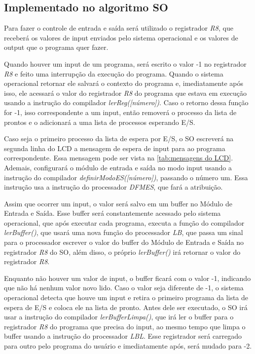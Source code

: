 \documentclass[
	12pt,				%
	oneside,
	a4paper,			%
	english,			%
	french,				%
	spanish,			%
	brazil,				%
	]{abntex2}
\begin{document}
\subsection{Implementado no algoritmo SO}

Para fazer o controle de entrada e saída será utilizado o registrador \textit{R8}, que receberá os valores de input enviados pelo sistema operacional e os valores de output que o programa quer fazer. 

Quando houver um input de um programa, será escrito o valor -1 no registrador \textit{R8} e feito uma interrupção da execução do programa. Quando o sistema operacional retornar ele salvará o contexto do programa e, imediatamente após isso, ele acessará o valor do registrador \textit{R8} do programa que estava em execução usando a instrução do compilador \textit{lerReg([número])}. Caso o retorno dessa função for -1, isso correspondente a um input, então removerá o processo da lista de prontos e o adicionará a uma lista de processos esperando E/S. 

Caso seja o primeiro processo da lista de espera por E/S, o SO escreverá na segunda linha do LCD a mensagem de espera de input para ao programa correspondente. Essa mensagem pode ser vista na \autoref{tab:mensagens do LCD}. Ademais, configurará o módulo de entrada e saída no modo input usando a instrução do compilador \textit{definirModoES([número])}, passando o número um. Essa instrução usa a instrução do processador \textit{DFMES}, que fará a atribuição.

Assim que ocorrer um input, o valor será salvo em um buffer no Módulo de Entrada e Saída. Esse buffer será constantemente acessado pelo sistema operacional, que após executar cada programa, executa a função do compilador \textit{lerBuffer()}, que usará uma nova função do processador \textit{LB}, que passa um sinal para o processador escrever o valor do buffer do Módulo de Entrada e Saída no registrador \textit{R8} do SO, além disso, o próprio \textit{lerBuffer()} irá retornar o valor do registrador \textit{R8}.

Enquanto não houver um valor de input, o buffer ficará com o valor -1, indicando que não há nenhum valor novo lido. Caso o valor seja diferente de -1, o sistema operacional detecta que houve um input e retira o primeiro programa da lista de espera de E/S e coloca ele na lista de pronto. Antes dele ser executado, o SO irá usar a instrução do compilador \textit{lerBufferLimpa()}, que irá ler o buffer para o registrador \textit{R8} do programa que precisa do input, ao mesmo tempo que limpa o buffer usando a instrução do processador \textit{LBL}. Esse registrador será carregado para outro pelo programa do usuário e imediatamente após, será mudado para -2.
\end{document}
